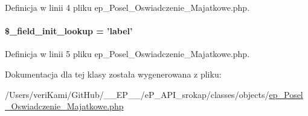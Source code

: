Definicja w linii 4 pliku ep\-\_\-\-Posel\-\_\-\-Oswiadczenie\-\_\-\-Majatkowe.\-php.

\hypertarget{classep___posel___oswiadczenie___majatkowe_a4a4d54ae35428077a7c61ec8a5139af3}{
\paragraph[{\$\-\_\-field\-\_\-init\-\_\-lookup}]{\setlength{\rightskip}{0pt plus 5cm}\$\-\_\-field\-\_\-init\-\_\-lookup = 'label'}}\label{classep___posel___oswiadczenie___majatkowe_a4a4d54ae35428077a7c61ec8a5139af3}


Definicja w linii 5 pliku ep\-\_\-\-Posel\-\_\-\-Oswiadczenie\-\_\-\-Majatkowe.\-php.



Dokumentacja dla tej klasy została wygenerowana z pliku\-:\begin{DoxyCompactItemize}
\item 
/\-Users/veri\-Kami/\-Git\-Hub/\-\_\-\-\_\-\-E\-P\-\_\-\-\_\-/e\-P\-\_\-\-A\-P\-I\-\_\-srokap/classes/objects/\hyperlink{ep___posel___oswiadczenie___majatkowe_8php}{ep\-\_\-\-Posel\-\_\-\-Oswiadczenie\-\_\-\-Majatkowe.\-php}\end{DoxyCompactItemize}
